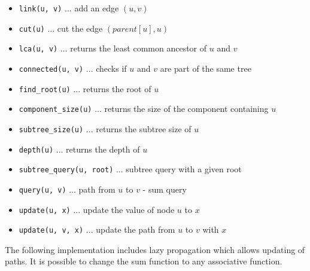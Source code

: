 {
\begin{itemize}
  \item{\lstinline{link(u, v)} ... add an edge $(u, v)$}
  \item{\lstinline{cut(u)} ... cut the edge $(parent[u], u)$}
  \item{\lstinline{lca(u, v)} ... returns the least common ancestor of $u$ and $v$}
  \item{\lstinline{connected(u, v)} ... checks if $u$ and $v$ are part of the same tree}
  \item{\lstinline{find_root(u)} ... returns the root of $u$}
  \item{\lstinline{component_size(u)} ... returns the size of the component containing $u$}
  \item{\lstinline{subtree_size(u)} ... returns the subtree size of $u$}
  \item{\lstinline{depth(u)} ... returns the depth of $u$}
  \item{\lstinline{subtree_query(u, root)} ... subtree query with a given root}
  \item{\lstinline{query(u, v)} ... path from $u$ to $v$ - sum query}
  \item{\lstinline{update(u, x)} ... update the value of node $u$ to $x$}
  \item{\lstinline{update(u, v, x)} ... update the path from $u$ to $v$ with $x$}
\end{itemize}
}

The following implementation includes lazy propagation which allows updating of paths.
It is possible to change the sum function to any associative function.

